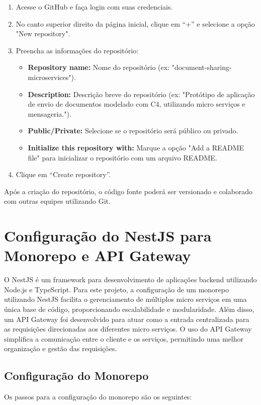 \begin{enumerate}
    \item Acesse o GitHub e faça login com suas credenciais.
    \item No canto superior direito da página inicial, clique em “+” e selecione a opção "New repository".
    \item Preencha as informações do repositório:
    \begin{itemize}
        \item \textbf{Repository name:} Nome do repositório (ex: "document-sharing-microservices").
        \item \textbf{Description:} Descrição breve do repositório (ex: "Protótipo de aplicação de envio de documentos modelado com C4, utilizando micro serviços e mensageria.").
        \item \textbf{Public/Private:} Selecione se o repositório será público ou privado.
        \item \textbf{Initialize this repository with:} Marque a opção "Add a README file" para inicializar o repositório com um arquivo README.
    \end{itemize}
    \item Clique em “Create repository”.
\end{enumerate}

Após a criação do repositório, o código fonte poderá ser versionado e colaborado com outras equipes utilizando Git.

\section{Configuração do NestJS para Monorepo e API Gateway}

O NestJS é um framework para desenvolvimento de aplicações backend utilizando Node.js e TypeScript. Para este projeto, a configuração de um monorepo utilizando NestJS facilita o gerenciamento de múltiplos micro serviços em uma única base de código, proporcionando escalabilidade e modularidade. Além disso, um API Gateway foi desenvolvido para atuar como a entrada centralizada para as requisições direcionadas aos diferentes micro serviços. O uso do API Gateway simplifica a comunicação entre o cliente e os serviços, permitindo uma melhor organização e gestão das requisições.

\subsection{Configuração do Monorepo}
Os passos para a configuração do monorepo são os seguintes:

